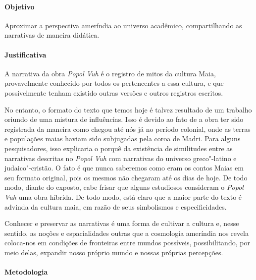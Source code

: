 \documentclass[12pt]{extarticle}
\begin{document}
\paragraph{Objetivo} Aproximar a perspectiva ameríndia ao universo acadêmico, 
compartilhando as narrativas de maneira didática.

\paragraph{Justificativa} A narrativa da obra \emph{Popol Vuh} é o registro de mitos da
cultura Maia, provavelmente conhecido por todos os pertencentes a essa
cultura, e que possivelmente tenham existido outras versões e outros registros
escritos.

No entanto, o formato do texto que temos hoje é talvez
resultado de um trabalho oriundo de uma mistura de influências. Isso é
devido ao fato de a obra ter sido registrada da maneira como chegou até
nós já no período colonial, onde as terras e populações maias haviam
sido subjugadas pela coroa de Madri. Para alguns pesquisadores, isso
explicaria o porquê da existência de similitudes entre as narrativas
descritas no \emph{Popol Vuh} com narrativas do universo greco"-latino e
judaico"-cristão. O fato é que nunca saberemos como eram os contos Maias
em seu formato original, pois os mesmos não chegaram até os dias de
hoje. De todo modo, diante do exposto, cabe frisar que alguns estudiosos
consideram o \emph{Popol Vuh} uma obra híbrida. De todo modo, está
claro que a maior parte do texto é advinda da cultura maia, em razão de
seus simbolismos e especificidades.

Conhecer e preservar as narrativas é uma forma de
cultivar a cultura e, nesse sentido, as noções e espacialidades outras 
que a cosmologia ameríndia nos revela coloca-nos em condições de fronteiras 
entre mundos possíveis, possibilitando, por meio delas, expandir nosso 
próprio mundo e nossas próprias percepções.

\paragraph{Metodologia} 
\end{document}
